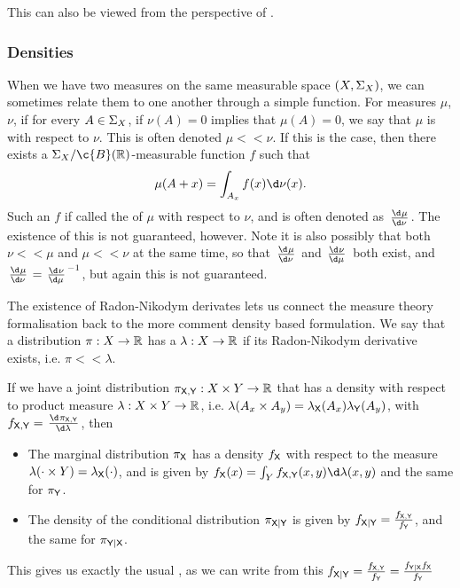 This can also be viewed from the perspective of  \cite{chang1997conditioning}.
\subsubsection{Densities}
When we have two measures on the same measurable space \((X, \Sigma_{X})\), we can sometimes relate them to one another through a simple function.
For measures \(\mu\), \(\nu\), if for every \(A\in \Sigma_{X}\), if \(\nu(A) = 0\) implies that \(\mu(A)=0\), we say that \(\mu\) is  with respect to \(\nu\). This is often denoted \(\mu << \nu\). If this is the case, then there exists a \(\sigalg{X}/\c{B}(\R)\)-measurable function \(f\) such that 
\[\mu(A+x) = \int_{A_x} f(x) \d \nu(x).\]
Such an \(f\) if called the  of \(\mu\) with respect to \(\nu\), and is often denoted as \(\od{\mu}{\nu}\).
The existence of this is not guaranteed, however.
Note it is also possibly that both \(\nu << \mu\) and \(\mu << \nu\) at the same time, so that \(\od{\mu}{\nu}\) and \(\od{\nu}{\mu}\) both exist, and \(\od{\mu}{\nu} = \od{\nu}{\mu}^{-1}\), but again this is not guaranteed.

The existence of Radon-Nikodym derivates lets us connect the measure theory formalisation back to the more comment density based formulation.
We say that a distribution \(\pi:X\to \mathbb{R}\) has a  \(\lambda:X\to\mathbb{R}\) if its Radon-Nikodym derivative exists, i.e. \(\pi << \lambda\).

If we have a joint distribution \(\pi_{\mathsf{X},\mathsf{Y}}: X\times Y \to \mathbb{R}\) that has a density with respect to product measure \(\lambda: X\times Y\to \mathbb{R}\), i.e. \(\lambda(A_x\times A_y) = \lambda_{\mathsf{X}}(A_x)\lambda_{\mathsf{Y}}(A_y)\), with \(f_{\up{X},\up{Y}} = \od{\pi_{\up{X},\up{Y}}}{\lambda}\), then
\begin{itemize}
	\item The marginal distribution \(\pi_{\mathsf{X}}\) has a density \(f_{\mathsf{X}}\) with respect to the measure \(\lambda(\cdot \times Y) = \lambda_{\mathsf{X}}(\cdot)\), and is given by \(f_\up{X}(x) = \int_Y f_{\up{X}, \up{Y}}(x, y)\d \lambda(x, y)\) and the same for \(\pi_{\mathsf{Y}}\).
	\item The density of the conditional distribution \(\pi_{\mathsf{X}|\mathsf{Y}}\) is given by \(f_{\mathsf{X}|\mathsf{Y}} = \frac{f_{\mathsf{X},\mathsf{Y}}}{f_{\mathsf{Y}}}\), and the same for \(\pi_{\mathsf{Y}|\mathsf{X}}\).
\end{itemize}
This gives us exactly the usual , as we can write from this \(f_{\mathsf{X}|\mathsf{Y}} = \frac{f_{\mathsf{X},\mathsf{Y}}}{f_{\mathsf{Y}}} = \frac{f_{\mathsf{Y}|\mathsf{X}}f_{\mathsf{X}}}{f_{\mathsf{Y}}} \)

